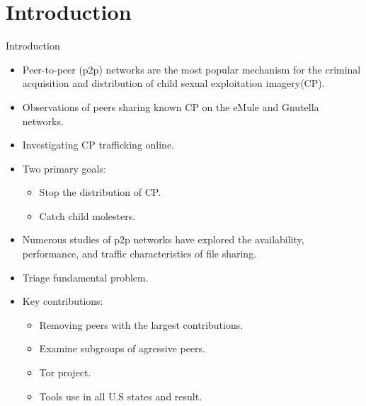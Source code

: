 \documentclass[notes]{beamer}
\begin{document}
\section{Introduction} 
\begin{frame} %
\begin{block}{Introduction}
\begin{itemize} 

\item[\checkmark] Peer-to-peer (p2p) networks are the most popular mechanism for the criminal acquisition and distribution of child sexual exploitation imagery(CP).
\item[\checkmark] Observations of peers sharing known CP on the eMule and Gnutella networks.
\item[\checkmark] Investigating CP trafficking online.
\item[\checkmark] Two primary goals:

\begin{itemize}

\item Stop the distribution of CP.
\item Catch child molesters.

\end{itemize}
\end{itemize}
\end{block}
\end{frame}

\begin{frame}
\begin{itemize}

\item[\checkmark] Numerous studies of p2p networks have explored the availability, performance, and traffic characteristics of file sharing.
\item[\checkmark] Triage fundamental problem.
\item[\checkmark] Key contributions:

\begin{itemize}

\item Removing peers with the largest contributions.
\item Examine subgroups of agressive peers.
\item Tor project.
\item Tools use in all U.S states and result.

\end{itemize}
\end{itemize}
\end{frame}
\end{document}
